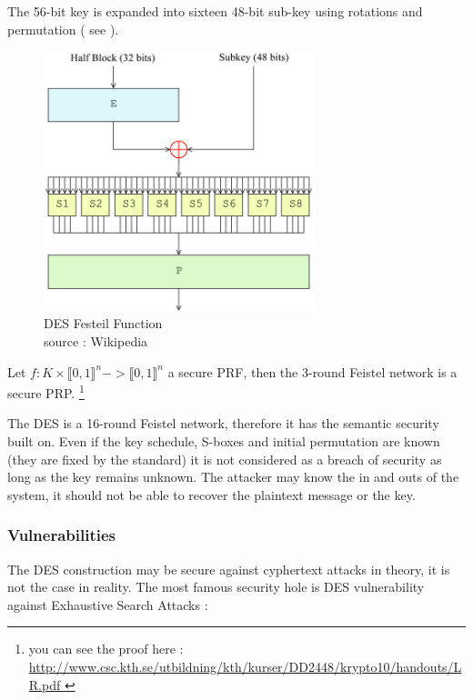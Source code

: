 The 56-bit key is expanded into sixteen 48-bit sub-key using rotations and permutation ( see \cite{DES-wikipedia} ).

\begin{figure}[ht!]
    \centering
       \includegraphics[width=0.7\textwidth]{images/DES-f-function.png}
    \caption{DES Festeil Function \\ source : Wikipedia}
	\label{fig:DES-f-function}
\end{figure}


\begin{mytheorem}
    Let $f:K\times\llbracket0,1\rrbracket^n -> \llbracket0,1\rrbracket^n$ a secure PRF, then the 3-round Feistel network is a secure PRP. \footnote{ you can see the proof here : \url{http://www.csc.kth.se/utbildning/kth/kurser/DD2448/krypto10/handouts/LR.pdf }}
\end{mytheorem}

The DES is a 16-round Feistel network, therefore it has the semantic security built on.  Even if the key schedule, S-boxes and initial permutation are known (they are fixed by the standard) it is not considered as a breach of security as long as the key remains unknown. The attacker may know the in and outs of the system, it should not be able to recover the plaintext message or the key.

\subsubsection{ Vulnerabilities }

The DES construction may be secure against cyphertext attacks in theory, it is not the case in reality. The most famous security hole is DES vulnerability against Exhaustive Search Attacks : 	

